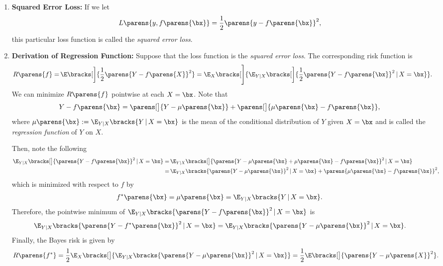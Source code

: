 \documentclass[12pt]{article}
\begin{document}
\begin{enumerate}[label=\textbf{\arabic*.}]
	\item \textbf{Squared Error Loss:} If we let 
	\begin{align*}
		L \parens{y, f \parens{\bx}} = \frac{1}{2} \parens{y - f \parens{\bx}}^2, 
	\end{align*}
	this particular loss function is called the \textit{squared error loss}. 
	
	\item \textbf{Derivation of Regression Function:} Suppose that the loss function is the \textit{squared error loss}. The corresponding risk function is 
	\begin{align*}
		R \parens{f} = & \, \E \bracks[\bigg]{\frac{1}{2} \parens{Y - f \parens{X}}^2}
		= \E_{X} \bracks[\Bigg]{\E_{Y \vert X} \bracks[\bigg]{\frac{1}{2} \parens{Y - f \parens{\bx}}^2 \,\vert\, X = \bx}}. 
	\end{align*}
	We can minimize $R \parens{f}$ pointwise at each $X = \bx$. Note that 
	\begin{align*}
		Y - f \parens{\bx} = \parens[\big]{Y - \mu \parens{\bx}} + \parens[\big]{\mu \parens{\bx} - f \parens{\bx}}, 
	\end{align*}
	where $\mu \parens{\bx} := \E_{Y \vert X} \bracks{Y \,\vert\, X = \bx}$ is the mean of the conditional distribution of $Y$ given $X = \bx$ and is called the \emph{regression function} of $Y$ on $X$. 
	
	Then, note the following 
	\begin{align*}
		\E_{Y \vert X} \bracks[\big]{ \parens{Y - f \parens{\bx}}^2 \,\vert\, X = \bx} = & \, \E_{Y \vert X} \bracks[\big]{ \parens{Y - \mu \parens{\bx} + \mu \parens{\bx} - f \parens{\bx}}^2 \,\vert\, X = \bx} \\ 
		= & \, \E_{Y \vert X} \bracks{ \parens{Y - \mu \parens{\bx}}^2 \,\vert\, X = \bx} + \parens{\mu \parens{\bx} - f \parens{\bx}}^2, 
	\end{align*}
	which is minimized with respect to $f$ by 
	\begin{align*}
		f^* \parens{\bx} = \mu \parens{\bx} = \E_{Y \vert X} \bracks{Y \,\vert\, X = \bx}. 
	\end{align*}
	Therefore, the pointwise minimum of $\E_{Y \vert X} \bracks{ \parens{Y - f \parens{\bx}}^2 \,\vert\, X = \bx}$ is 
	\begin{align*}
		\E_{Y \vert X} \bracks{ \parens{Y - f^* \parens{\bx}}^2 \,\vert\, X = \bx} = \E_{Y \vert X} \bracks{ \parens{Y - \mu \parens{\bx}}^2 \,\vert\, X = \bx}. 
	\end{align*}
	Finally, the Bayes risk is given by 
	\begin{align*}
		R \parens{f^*} = \frac{1}{2} \E_{X} \bracks[\big]{\E_{Y \vert X} \bracks{ \parens{Y - \mu \parens{\bx}}^2 \,\vert\, X = \bx}} = \frac{1}{2} \E \bracks[\big]{\parens{Y - \mu \parens{X}}^2}. 
	\end{align*}
	

\end{enumerate}
\end{document}

